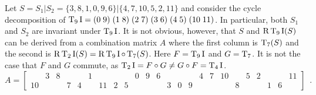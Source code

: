 \begin{example}
	\label{topSquareSideExample}
    \cite[218]{Starr1984}
    Let $S = S_1 | S_2 = \{ 3, 8, 1, 0, 9, 6 \} | \{ 4, 7, 10, 5, 2, 11 \}$ and consider the cycle decomposition of $\operatorname{T}_9\operatorname{I} = (0 \; 9) \; (1 \; 8) \; (2 \; 7) \; (3 \; 6) \; (4 \; 5) \; (10 \; 11)$. In particular, both $S_1$ and $S_2$ are invariant under $\operatorname{T}_9\operatorname{I}$. It is not obvious, however, that $S$ and $\operatorname{R}\operatorname{T}_9\operatorname{I}(S)$ can be derived from a combination matrix $A$ where the first column is $\operatorname{T}_7(S)$ and the second is $\operatorname{R}\operatorname{T}_2\operatorname{I}(S) = \operatorname{R}\operatorname{T}_9\operatorname{I} \circ \operatorname{T}_7(S)$. Here $F = \operatorname{T}_9\operatorname{I}$ and $G = \operatorname{T}_7$. It is not the case that $F$ and $G$ commute, as $\operatorname{T}_2\operatorname{I} = F \circ G \ne G \circ F = \operatorname{T}_4\operatorname{I}$.
    \begin{equation}
    	\label{topSquareSideEquation}
        A = \left[
        \begin{array}{cccccccccccc|cccccccccccc}
            & 3 & 8 &&& 1 &&&& 0 & 9 & 6 &&&& 4 & 7 & 10 && 5 & 2 &&& 11 \\
            10 &&& 7 & 4 && 11 & 2 & 5 &&&& 3 & 0 & 9 &&&& 8 &&& 1 & 6 &
        \end{array}
        \right] \enspace.
    \end{equation}
\end{example}

